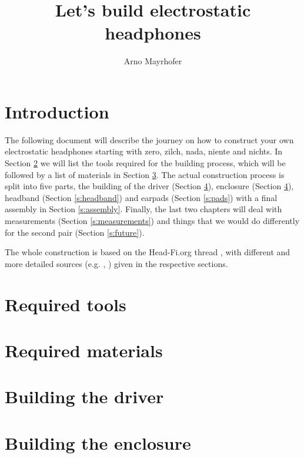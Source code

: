 \documentclass{article}
\begin{document}
\title{Let's build electrostatic headphones}
\author{Arno Mayrhofer}
\maketitle

\tableofcontents

\newpage

\section{Introduction}
\label{s:intro}
The following document will describe the journey on how to construct your own electrostatic headphones starting with zero, zilch, nada, niente and nichts. In Section \ref{s:tools} we will list the tools required for the building process, which will be followed by a list of materials in Section \ref{s:materials}. The actual construction process is split into five parts, the building of the driver (Section \ref{s:driver}), enclosure (Section \ref{s:driver}), headband (Section \ref{s:headband}) and earpads (Section \ref{s:pads}) with a final assembly in Section \ref{s:assembly}. Finally, the last two chapters will deal with measurements (Section \ref{s:measurements}) and things that we would do differently for the second pair (Section \ref{s:future}).

The whole construction is based on the Head-Fi.org thread \cite{head-fi-diy-thread}, with different and more detailed sources (e.g. \cite{electrostatic-hp-design}, \cite{tcengineering-electrostatic-drivers}) given in the respective sections.

\section{Required tools}
\label{s:tools}

\section{Required materials}
\label{s:materials}

\section{Building the driver}
\label{s:driver}

\section{Building the enclosure}
\label{s:enclosure}
\end{document}
